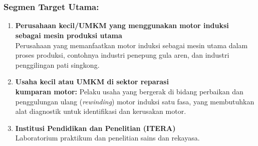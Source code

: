\documentclass{elsinta}
\begin{document}
\section{\BusinessAnalysisTitle}

\subsection{\MarketNeedsTitle}

\subsubsection*{Segmen Target Utama:}
\begin{enumerate}
    \item   \textbf{Perusahaan kecil/UMKM yang menggunakan motor induksi sebagai mesin produksi utama}\\
            Perusahaan yang memanfaatkan motor induksi sebagai
            mesin utama dalam proses produksi, contohnya industri penepung
            gula aren, dan industri penggilingan pati singkong.
    \item   \textbf{Usaha kecil atau UMKM di sektor reparasi\\
            kumparan motor:} Pelaku usaha yang bergerak di 
            bidang perbaikan dan penggulungan ulang 
            (\textit{rewinding}) motor induksi satu fasa, yang membutuhkan alat
            diagnostik untuk identifikasi dan kerusakan
            motor.
    \item   \textbf{Institusi Pendidikan dan Penelitian (ITERA)}\\
            Laboratorium praktikum dan penelitian sains dan rekayasa. 
            
\end{enumerate}
\end{document}
